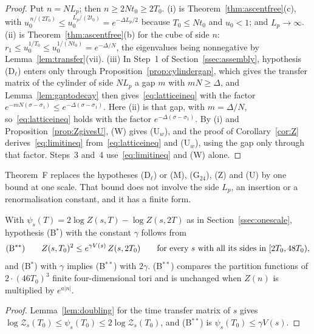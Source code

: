 \begin{proof}
Put $n=NL_p$; then $n\ge2Nt_0\ge2T_0$. (i) is
Theorem~\ref{thm:ascentfree}(c), with $u_0^{\,n/(2T_0)}\le u_0^{L_p/(2t_0)}=
e^{-\Delta L_p/2}$ because $T_0\le Nt_0$ and $u_0<1$; and $L_p\to\infty$.
(ii) is Theorem~\ref{thm:ascentfree}(b) for the cube of side $n$: $r_1\le
u_0^{1/T_0}\le u_0^{1/(Nt_0)}=e^{-\Delta/N}$, the eigenvalues being
nonnegative by Lemma~\ref{lem:transfer}(vii). (iii) In Step~1 of
Section~\ref{ssec:assembly}, hypothesis (D$_\ell$) enters only through
Proposition~\ref{prop:cylindergap}, which gives the transfer matrix of the
cylinder of side $NL_p$ a gap $m$ with $mN\ge\Delta$, and
Lemma~\ref{lem:gaptodecay} then gives~\eqref{eq:latticeineq} with the factor
$e^{-mN(\sigma-\sigma_1)}\le e^{-\Delta(\sigma-\sigma_1)}$. Here (ii) is that
gap, with $m=\Delta/N$, so~\eqref{eq:latticeineq} holds with the factor
$e^{-\Delta(\sigma-\sigma_1)}$. By (i) and Proposition~\ref{prop:ZgivesU},
\textup{(W)} gives \textup{(U$_w$)}, and the proof of
Corollary~\ref{cor:Z} derives~\eqref{eq:limitineq} from~\eqref{eq:latticeineq}
and \textup{(U$_w$)}, using the gap only through that factor. Steps~3
and~4 use~\eqref{eq:limitineq} and \textup{(W)} alone.
\end{proof}

Theorem~F replaces the hypotheses (D$_\ell$) or (M), (G$_{24}$), (Z) and (U)
by one bound at one scale. That bound does not involve the side $L_p$, an
insertion or a renormalisation constant, and it has a finite form.

\begin{proposition}\label{prop:Bfinite}
With $\psi_s(T)=2\log Z(s,T)-\log Z(s,2T)$ as in Section~\ref{ssec:onescale},
hypothesis \textup{(B$^*$)} with the constant $\gamma$ follows from
\[
\textup{(B$^{**}$)}\qquad Z(s,T_0)^2\le e^{\gamma V(s)}\,Z(s,2T_0)\qquad
\text{for every }s\text{ with all its sides in }[2T_0,48T_0),
\]
and \textup{(B$^*$)} with $\gamma$ implies \textup{(B$^{**}$)} with $2\gamma$.
\textup{(B$^{**}$)} compares the partition functions of $2\cdot(46T_0)^3$
finite four-dimensional tori and is unchanged when $Z(n)$ is multiplied by
$e^{a|n|}$.
\end{proposition}

\begin{proof}
Lemma~\ref{lem:doubling} for the time transfer matrix of $s$ gives $\log
\mathcal Z_s(T_0)\le\psi_s(T_0)\le2\log\mathcal Z_s(T_0)$, and (B$^{**}$) is
$\psi_s(T_0)\le\gamma V(s)$.
\end{proof}

